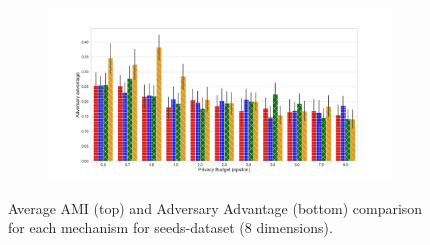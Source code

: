 \begin{figure}[H]
\begin{subfigure}{1\textwidth}
  \end{subfigure}
  \begin{subfigure}{1\textwidth}
    \includegraphics[width=1\textwidth]{Results/kd-laplace/shokri_mi_adv_seeds-dataset_comparison.png}
  \end{subfigure}
  \caption{Average AMI (top) and Adversary Advantage (bottom) comparison for each mechanism for seeds-dataset (8 dimensions).}
  \label{fig:utility_seeds-dataset_comparison_nd_plot}
\end{figure}
\newpage


